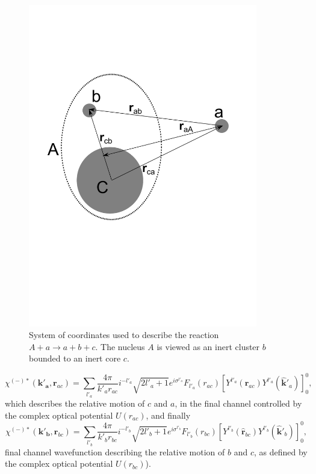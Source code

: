 \begin{subappendices}
\begin{figure}
\centerline{\includegraphics*[width=10cm,angle=0]{C6/figs_C6/knock1.pdf}}
\vspace{-4cm}
\caption{System of coordinates used to describe the reaction $A+a \rightarrow a+b+c$. The nucleus $A$ is viewed as an inert cluster $b$ bounded to an inert core $c$.}\label{figC6F1}
\end{figure}
 \begin{equation}\label{eqC6AppF7}
\chi^{(-)*}(\mathbf{k'_{a}},\mathbf{r}_{ac})= \sum_{l'_a}\frac{4\pi}{k'_a r_{ac}} i^{-l'_a}\sqrt{2l'_a+1}
e^{i\sigma^{l'_a}} F_{l'_a}(r_{ac}) \left[ Y^{l'_a} (\hat{\mathbf r}_{ac}) Y^{l'_a} (\hat{ \mathbf k}'_{a})\right]^0_0,
\end{equation}
which describes the  relative motion of $c$ and $a$, in the final channel controlled by the complex optical potential $U(r_{ac})$, and finally
 \begin{equation}\label{eqC6AppF8}
\chi^{(-)*}(\mathbf{k'_{b}},\mathbf{r}_{bc})= \sum_{l'_b}\frac{4\pi}{k'_b r_{bc}} i^{-l'_b}\sqrt{2l'_b+1}
e^{i\sigma^{l'_b}} F_{l'_b}(r_{bc}) \left[ Y^{l'_b} (\hat{\mathbf r}_{bc}) Y^{l'_b} (\hat{ \mathbf k}'_{b})\right]^0_0,
\end{equation}
final channel  wavefunction describing the relative motion of $b$ and $c$, as defined by the complex optical potential $U(r_{bc})$).

\end{subappendices}
